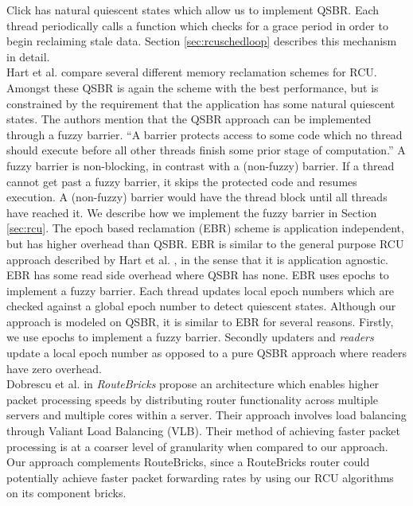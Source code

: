\documentclass[a4paper]{article}
\begin{document}
Click has natural quiescent states which allow us to implement QSBR. Each thread periodically calls a function which checks for a grace period in order to begin reclaiming stale data. Section \ref{sec:rcuschedloop} describes this mechanism in detail.\\

Hart et al. \cite{hart} compare several different memory reclamation schemes for RCU. Amongst these QSBR is again the scheme with the best performance, but is constrained by the requirement that the application has some natural quiescent states. The authors mention that the QSBR approach can be implemented through a fuzzy barrier. ``A barrier protects access to some code which no thread should execute before all other threads finish some prior stage of computation.'' A fuzzy barrier is non-blocking, in contrast with a (non-fuzzy) barrier. If a thread cannot get past a fuzzy barrier, it skips the protected code and resumes execution. A (non-fuzzy) barrier would have the thread block until all threads have reached it. We describe how we implement the fuzzy barrier in Section \ref{sec:rcu}. The epoch based reclamation (EBR) scheme is application independent, but has higher overhead than QSBR. EBR is similar to the general purpose RCU approach described by Hart et al. \cite{urcu}, in the sense that it is application agnostic. EBR has some read side overhead where QSBR has none. EBR uses epochs to implement a fuzzy barrier. Each thread updates local epoch numbers which are checked against a global epoch number to detect quiescent states. Although our approach is modeled on QSBR, it is similar to EBR for several reasons. Firstly, we use epochs to implement a fuzzy barrier. Secondly updaters and \emph{readers} update a local epoch number as opposed to a pure QSBR approach where readers have zero overhead.\\

Dobrescu et al. \cite{routebricks} in \emph{RouteBricks} propose an architecture which enables higher packet processing speeds by distributing router functionality across multiple servers and multiple cores within a server. Their approach involves load balancing through Valiant Load Balancing (VLB). Their method of achieving faster packet processing is at a coarser level of granularity when compared to our approach. Our approach complements RouteBricks, since a RouteBricks router could potentially achieve faster packet forwarding rates by using our RCU algorithms on its component bricks.\\
\end{document}
